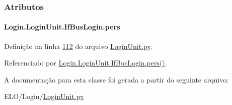 \subsubsection{Atributos}
\hypertarget{classLogin_1_1LoginUnit_1_1IfBusLogin_a53b8075436052b94282021c84a2c3211}{
\paragraph[{pers}]{\setlength{\rightskip}{0pt plus 5cm}Login.\-Login\-Unit.\-If\-Bus\-Login.\-pers}}\label{classLogin_1_1LoginUnit_1_1IfBusLogin_a53b8075436052b94282021c84a2c3211}


Definição na linha \hyperlink{LoginUnit_8py_source_l00112}{112} do arquivo \hyperlink{LoginUnit_8py_source}{Login\-Unit.\-py}.



Referenciado por \hyperlink{classLogin_1_1LoginUnit_1_1IfBusLogin_a807b0a5d5bdae58087feb9d810a6538d}{Login.\-Login\-Unit.\-If\-Bus\-Login.\-pers()}.



A documentação para esta classe foi gerada a partir do seguinte arquivo\-:\begin{DoxyCompactItemize}
\item 
E\-L\-O/\-Login/\hyperlink{LoginUnit_8py}{Login\-Unit.\-py}\end{DoxyCompactItemize}
